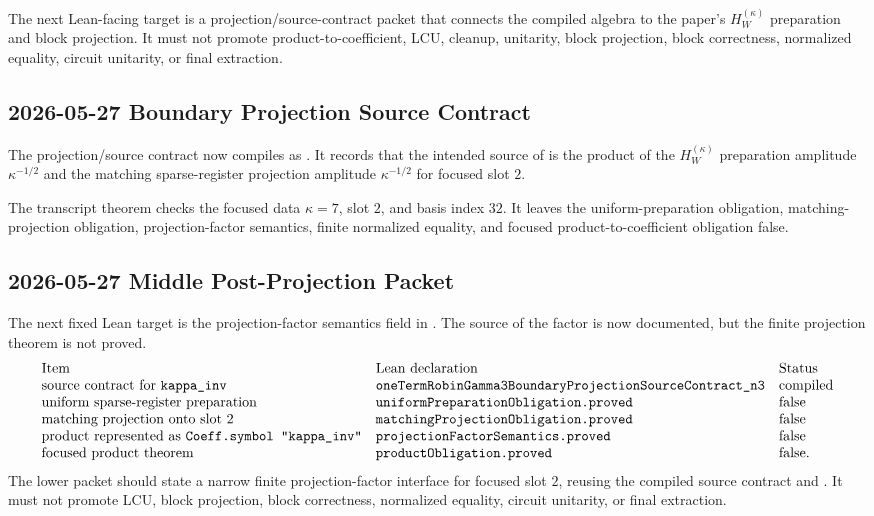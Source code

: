 The next Lean-facing target is a projection/source-contract packet that
connects the compiled  algebra to the paper's
\(H_W^{(\kappa)}\) preparation and block projection.  It must not promote
product-to-coefficient, LCU, cleanup, unitarity, block projection, block
correctness, normalized equality, circuit unitarity, or final extraction.

\subsection{2026-05-27 Boundary Projection Source Contract}

The projection/source contract now compiles as
.
It records that the intended source of  is the
product of the \(H_W^{(\kappa)}\) preparation amplitude
\(\kappa^{-1/2}\) and the matching sparse-register projection amplitude
\(\kappa^{-1/2}\) for focused slot \(2\).

The transcript theorem
checks the focused data \(\kappa=7\), slot \(2\), and basis index \(32\).
It leaves the uniform-preparation obligation, matching-projection obligation,
projection-factor semantics, finite normalized equality, and focused
product-to-coefficient obligation false.

\subsection{2026-05-27 Middle Post-Projection Packet}

The next fixed Lean target is the projection-factor semantics field in
.
The source of the factor is now documented, but the finite projection theorem
is not proved.
\[
\begin{array}{lll}
\text{Item} & \text{Lean declaration} & \text{Status}\\
\text{source contract for }\texttt{kappa\_inv} &
\texttt{oneTermRobinGamma3BoundaryProjectionSourceContract\_n3} &
\text{compiled}\\
\text{uniform sparse-register preparation} &
\texttt{uniformPreparationObligation.proved} & \text{false}\\
\text{matching projection onto slot }2 &
\texttt{matchingProjectionObligation.proved} & \text{false}\\
\text{product represented as }\texttt{Coeff.symbol "kappa\_inv"} &
\texttt{projectionFactorSemantics.proved} & \text{false}\\
\text{focused product theorem} &
\texttt{productObligation.proved} & \text{false}.
\end{array}
\]
The lower packet should state a narrow finite projection-factor interface for
focused slot \(2\), reusing the compiled source contract and
.  It must not promote
LCU, block projection, block correctness, normalized equality, circuit
unitarity, or final extraction.

